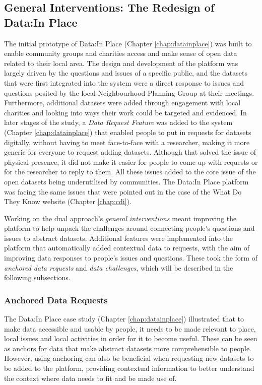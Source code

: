 \subsection[General Interventions]{General Interventions: The Redesign of Data:In Place}
\label{sec:data-in-place_redesing}
The initial prototype of Data:In Place (Chapter \ref{chap:datainplace}) was built to enable community groups and charities access and make sense of open data related to their local area. The design and development of the platform was largely driven by the questions and issues of a specific public, and the datasets that were first integrated into the system were a direct response to issues and questions posited by the local Neighbourhood Planning Group at their meetings. Furthermore, additional datasets were added through engagement with local charities and looking into ways their work could be targeted and evidenced. In later stages of the study, a \textit{Data Request Feature} was added to the system (Chapter \ref{chap:datainplace}) that enabled people to put in requests for datasets digitally, without having to meet face-to-face with a researcher, making it more generic for everyone to request adding datasets. Although that solved the issue of physical presence, it did not make it easier for people to come up with requests or for the researcher to reply to them. All these issues added to the core issue of the open datasets being underutilised by communities. The Data:In Place platform was facing the same issues that were pointed out in the case of the What Do They Know website (Chapter \ref{chap:cdi}).

Working on the dual approach's \textit{general interventions} meant improving the platform to help unpack the challenges around connecting people's questions and issues to abstract datasets. Additional features were implemented into the platform that automatically added contextual data to requests, with the aim of improving data responses to people's issues and questions. These took the form of \textit{anchored data requests} and \textit{data challenges}, which will be described in the following subsections.

\subsubsection{Anchored Data Requests}
\label{sub:anchour_requests}
The Data:In Place case study (Chapter \ref{chap:datainplace}) illustrated that to make data accessible and usable by people, it needs to be made relevant to place, local issues and local activities in order for it to become useful. These can be seen as anchors for data that make abstract datasets more comprehensible to people. However, using anchoring can also be beneficial when requesting new datasets to be added to the platform, providing contextual information to better understand the context where data needs to fit and be made use of.

